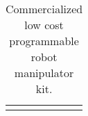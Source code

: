 \documentclass[conference]{IEEEtran}
\begin{document}
\begin{table}[h]
\begin{tabular}{lcccc}
     & \multicolumn{1}{l}{\cellcolor[HTML]{FFFFFF}}                                                                     
 
     & \multicolumn{1}{l}{\cellcolor[HTML]{FFFFFF}}                                                                   & 
\multicolumn{1}{l}{\cellcolor[HTML]{FFFFFF}}                                                                     & 
\multicolumn{1}{l}{\cellcolor[HTML]{FFFFFF}}                                                                       
\end{tabular}
\caption{Commercialized low cost programmable robot manipulator kit.}
\label{my-labelarm}
\end{table}



\end{document}
